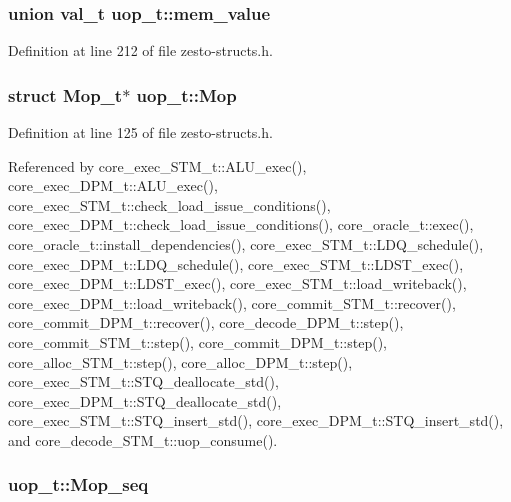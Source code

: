 \subsubsection[{mem\_\-value}]{\setlength{\rightskip}{0pt plus 5cm}union {\bf val\_\-t} {\bf uop\_\-t::mem\_\-value}\hspace{0.3cm}{\tt  [write]}}\label{structuop__t_295147d9fde1f5979b831cabcb79bb14}




Definition at line 212 of file zesto-structs.h.
\subsubsection[{Mop}]{\setlength{\rightskip}{0pt plus 5cm}struct {\bf Mop\_\-t}$\ast$ {\bf uop\_\-t::Mop}\hspace{0.3cm}{\tt  [read]}}\label{structuop__t_5752c48ff1454c5c470509db2fa46b7a}




Definition at line 125 of file zesto-structs.h.

Referenced by core\_\-exec\_\-STM\_\-t::ALU\_\-exec(), core\_\-exec\_\-DPM\_\-t::ALU\_\-exec(), core\_\-exec\_\-STM\_\-t::check\_\-load\_\-issue\_\-conditions(), core\_\-exec\_\-DPM\_\-t::check\_\-load\_\-issue\_\-conditions(), core\_\-oracle\_\-t::exec(), core\_\-oracle\_\-t::install\_\-dependencies(), core\_\-exec\_\-STM\_\-t::LDQ\_\-schedule(), core\_\-exec\_\-DPM\_\-t::LDQ\_\-schedule(), core\_\-exec\_\-STM\_\-t::LDST\_\-exec(), core\_\-exec\_\-DPM\_\-t::LDST\_\-exec(), core\_\-exec\_\-STM\_\-t::load\_\-writeback(), core\_\-exec\_\-DPM\_\-t::load\_\-writeback(), core\_\-commit\_\-STM\_\-t::recover(), core\_\-commit\_\-DPM\_\-t::recover(), core\_\-decode\_\-DPM\_\-t::step(), core\_\-commit\_\-STM\_\-t::step(), core\_\-commit\_\-DPM\_\-t::step(), core\_\-alloc\_\-STM\_\-t::step(), core\_\-alloc\_\-DPM\_\-t::step(), core\_\-exec\_\-STM\_\-t::STQ\_\-deallocate\_\-std(), core\_\-exec\_\-DPM\_\-t::STQ\_\-deallocate\_\-std(), core\_\-exec\_\-STM\_\-t::STQ\_\-insert\_\-std(), core\_\-exec\_\-DPM\_\-t::STQ\_\-insert\_\-std(), and core\_\-decode\_\-STM\_\-t::uop\_\-consume().
\subsubsection[{Mop\_\-seq}]{ {\bf uop\_\-t::Mop\_\-seq}}\label{structuop__t_46ca09f2272d8c3dd6b6b14d5e722185}




